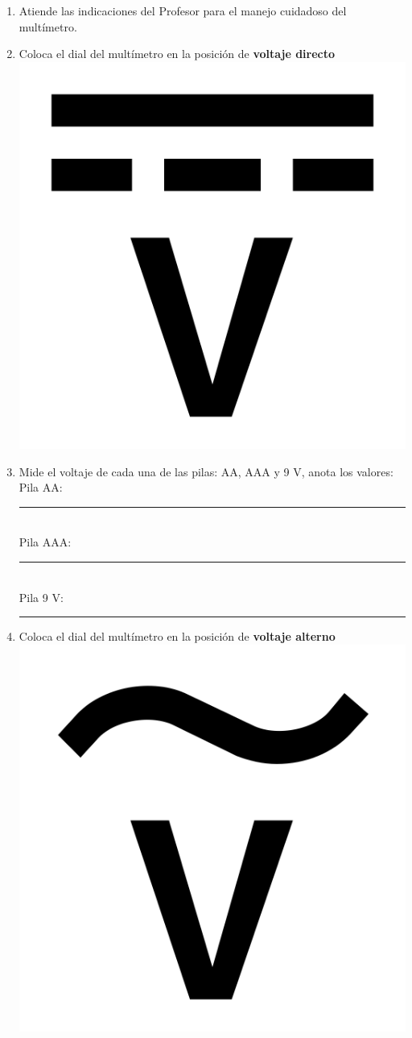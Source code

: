 \documentclass[14pt]{extarticle}
\begin{document}
\begin{enumerate}
\item Atiende las indicaciones del Profesor para el manejo cuidadoso del multímetro.
\item Coloca el dial del multímetro en la posición de \textbf{voltaje directo} \includegraphics[scale=0.05]{Imagenes/voltage-dc.png}
\item Mide el voltaje de cada una de las pilas: AA, AAA y 9 V, anota los valores: \\
Pila AA: \rule{2cm}{0.1mm} \\
Pila AAA: \rule{2cm}{0.1mm} \\
Pila 9 V: \rule{2cm}{0.1mm}
\item Coloca el dial del multímetro en la posición de \textbf{voltaje alterno} \includegraphics[scale=0.05]{Imagenes/voltage-ac.png}

\end{enumerate}
\end{document}
